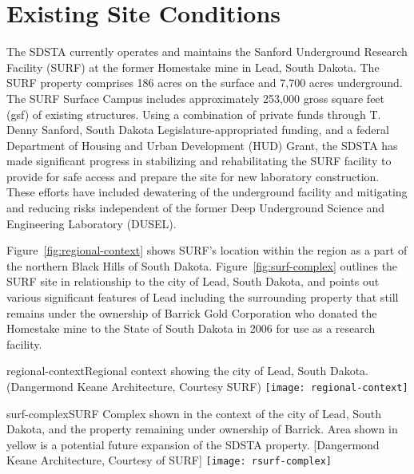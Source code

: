 \chapter{Existing Site Conditions}
\label{ch:fscf-site-cond}


The SDSTA currently operates and maintains the Sanford Underground Research Facility (SURF) at the former Homestake mine in Lead, South Dakota. The SURF property comprises 186 acres on the surface and 7,700 acres underground. The SURF Surface Campus includes approximately 253,000 gross square feet (gsf) of existing structures. Using a combination of private funds through T. Denny Sanford, South Dakota Legislature-appropriated funding, and a federal Department of Housing and Urban Development (HUD) Grant, the SDSTA has made significant progress in stabilizing and rehabilitating the SURF facility to provide for safe access and prepare the site for new laboratory construction. These efforts have included dewatering of the underground facility and mitigating and reducing risks independent of the former Deep Underground Science and Engineering Laboratory (DUSEL).

Figure~\ref{fig:regional-context} shows SURF's location within the region as a part of the northern Black Hills of South Dakota. Figure~\ref{fig:surf-complex} outlines the SURF site in relationship to the city of Lead, South Dakota, and points out various significant features of Lead including the surrounding property that still remains under the ownership of Barrick Gold Corporation who donated the Homestake mine to the State of South Dakota in 2006 for use as a research facility.

\begin{cdrfigure}{regional-context}{Regional context showing the city of Lead, South Dakota. (Dangermond Keane Architecture, Courtesy SURF)}
\texttt{[image: regional-context]}
\end{cdrfigure}


\begin{cdrfigure}{surf-complex}{SURF Complex shown in the context of the city of Lead, South Dakota, and the property remaining under ownership of Barrick. Area shown in yellow is a potential future expansion of the SDSTA property. [Dangermond Keane Architecture, Courtesy of SURF]}
\texttt{[image: rsurf-complex]}
\end{cdrfigure}



